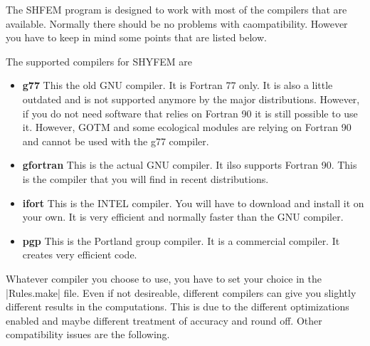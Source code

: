 
The SHFEM program is designed to work with most of the compilers
that are available. Normally there should be no problems with
caompatibility. However you have to keep in mind some points that are
listed below.

The supported compilers for SHYFEM are

\begin{itemize}

\item {\bf g77} This the old GNU compiler. It is Fortran 77 only. It
is also a little outdated and is not supported anymore by the major
distributions. However, if you do not need software that relies on
Fortran 90 it is still possible to use it. However, GOTM and some
ecological modules are relying on Fortran 90 and cannot be used with
the g77 compiler.

\item {\bf gfortran} This is the actual GNU compiler. It ilso
supports Fortran 90. This is the compiler that you will find in recent
distributions.

\item {\bf ifort} This is the INTEL compiler. You will have to download
and install it on your own. It is very efficient and normally faster
than the GNU compiler.

\item {\bf pgp} This is the Portland group compiler. It is a commercial
compiler. It creates very efficient code.

\end{itemize}

Whatever compiler you choose to use, you have to set your choice in the
|Rules.make| file. Even if not desireable, different compilers can give
you slightly different results in the computations. This is due to the
different optimizations enabled and maybe different treatment of accuracy
and round off. Other compatibility issues are the following.


